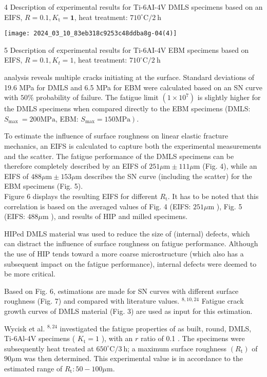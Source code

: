 \documentclass[10pt]{article}
\begin{document}
4 Description of experimental results for Ti-6AI-4V DMLS specimens based on an EIFS, $R=0.1, K_{\mathrm{t}}=\mathbf{1}$, heat treatment: $710^{\circ} \mathrm{C} / 2 \mathrm{~h}$

\begin{center}
\texttt{[image: 2024\_03\_10\_83eb318c9253c48ddba8g-04(4)]}
\end{center}

5 Description of experimental results for Ti-6AI-4V EBM specimens based on EIFS, $R=0.1, K_{t}=1$, heat treatment: $710^{\circ} \mathrm{C} / 2 \mathrm{~h}$

analysis reveals multiple cracks initiating at the surface. Standard deviations of 19.6 MPa for DMLS and 6.5 MPa for EBM were calculated based on an SN curve with $50 \%$ probability of failure. The fatigue limit $\left(1 \times 10^{7}\right)$ is slightly higher for the DMLS specimens when compared directly to the EBM specimens (DMLS: $S_{\text {max }}=200 \mathrm{MPa}$, EBM: $\left.S_{\max }=150 \mathrm{MPa}\right)$.

To estimate the influence of surface roughness on linear elastic fracture mechanics, an EIFS is calculated to capture both the experimental measurements and the scatter. The fatigue performance of the DMLS specimens can be therefore completely described by an EIFS of $251 \mu \mathrm{m} \pm 111 \mu \mathrm{m}$ (Fig. 4), while an EIFS of $488 \mu \mathrm{m} \pm 153 \mu \mathrm{m}$ describes the SN curve (including the scatter) for the EBM specimens (Fig. 5).\\
Figure 6 displays the resulting EIFS for different $R_{\mathrm{t}}$. It has to be noted that this correlation is based on the averaged values of Fig. 4 (EIFS: $251 \mu \mathrm{m}$ ), Fig. 5 (EIFS: $488 \mu \mathrm{m}$ ), and results of HIP and milled specimens.

HIPed DMLS material was used to reduce the size of (internal) defects, which can distract the influence of surface roughness on fatigue performance. Although the use of HIP tends toward a more coarse microstructure (which also has a subsequent impact on the fatigue performance), internal defects were deemed to be more critical.

Based on Fig. 6, estimations are made for SN curves with different surface roughness (Fig. 7) and compared with literature values. ${ }^{8,10,24}$ Fatigue crack growth curves of DMLS material (Fig. 3) are used as input for this estimation.

Wycisk et al. ${ }^{8,24}$ investigated the fatigue properties of as built, round, DMLS, Ti-6Al-4V specimens ( $K_{\mathrm{t}}=1$ ), with an $r$ ratio of 0.1 . The specimens were subsequently heat treated at $650^{\circ} \mathrm{C} / 3 \mathrm{~h}$; a maximum surface roughness $\left(R_{\mathrm{t}}\right)$ of $90 \mu \mathrm{m}$ was then determined. This experimental value is in accordance to the estimated range of $R_{\mathrm{t}}: 50-100 \mu \mathrm{m}$.
\end{document}
